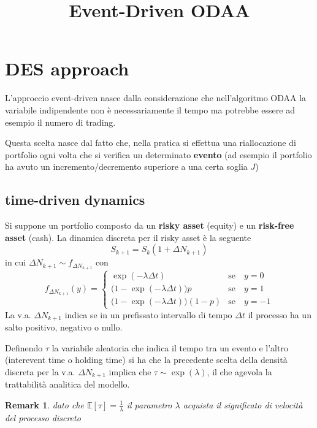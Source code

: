 \documentclass[12pt]{article}
\title{Event-Driven ODAA}
\author{}
\theoremstyle{break}
\newtheorem{remark}{Remark}
\begin{document}
\maketitle


\section{DES approach}
L'approccio event-driven nasce dalla considerazione che nell'algoritmo ODAA la variabile indipendente non è necessariamente il tempo ma potrebbe essere ad esempio il numero di trading.

 Questa scelta nasce dal fatto che, nella pratica si effettua una riallocazione di portfolio ogni volta che si verifica un determinato \textbf{evento} (ad esempio il portfolio ha avuto un incremento/decremento superiore a una certa soglia $J$) 
 
 \subsection{time-driven dynamics}
Si suppone un portfolio composto da un \textbf{risky asset} (equity) e un \textbf{risk-free asset} (cash). La dinamica discreta per il risky asset è la seguente 
\begin{equation}
S_{k+1} = S_{k} (1 + \Delta N_{k+1})
\end{equation}
in cui $\Delta N_{k+1} \sim f_{\Delta N_{k+1}} $ con
\[
f_{\Delta N_{k+1}}(y) = 
\begin{cases}
 \exp(-\lambda\Delta t) & \text{se} \quad y = 0 \\
 \Big(1-\exp(-\lambda\Delta t)\Big)p & \text{se} \quad y = 1 \\
 \Big(1-\exp(-\lambda\Delta t)\Big)(1-p) & \text{se} \quad y = -1
\end{cases}
\]
La v.a. $ \Delta N_{k+1} $ indica se in un prefissato intervallo di tempo $ \Delta t$ il processo ha un salto positivo, negativo o nullo.

Definendo $ \tau $ la variabile aleatoria che indica il tempo tra un evento e l'altro (interevent time o holding time) si ha che la precedente scelta della densità discreta per la v.a. $\Delta N_{k+1} $ implica che $\tau \sim \exp(\lambda)$, il che agevola la trattabilità analitica del modello.


\begin{remark}
	dato che $\mathbb{E}[\tau] = \frac{1}{\lambda}$ il parametro $\lambda$ acquista il significato di velocità del processo discreto
\end{remark}
\end{document}
